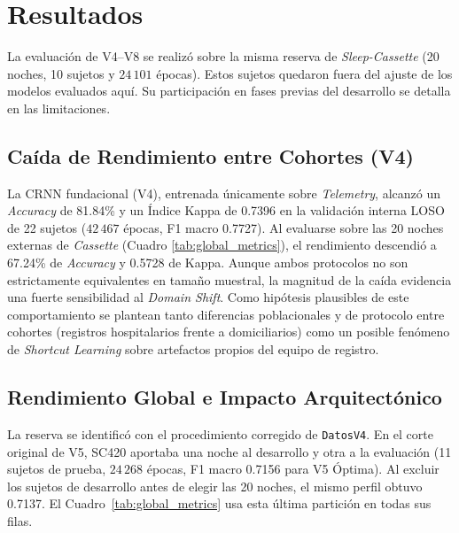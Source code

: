 \documentclass[conference]{IEEEtran}
\begin{document}
\section{Resultados}

La evaluación de V4--V8 se realizó sobre la misma reserva de \textit{Sleep-Cassette} (20 noches, 10 sujetos y $24\,101$ épocas). Estos sujetos quedaron fuera del ajuste de los modelos evaluados aquí. Su participación en fases previas del desarrollo se detalla en las limitaciones.

\subsection{Caída de Rendimiento entre Cohortes (V4)}
La CRNN fundacional (V4), entrenada únicamente sobre \textit{Telemetry}, alcanzó un \textit{Accuracy} de 81.84\% y un Índice Kappa de 0.7396 en la validación interna LOSO de 22 sujetos ($42\,467$ épocas, F1 macro 0.7727). Al evaluarse sobre las 20 noches externas de \textit{Cassette} (Cuadro \ref{tab:global_metrics}), el rendimiento descendió a 67.24\% de \textit{Accuracy} y 0.5728 de Kappa. Aunque ambos protocolos no son estrictamente equivalentes en tamaño muestral, la magnitud de la caída evidencia una fuerte sensibilidad al \textit{Domain Shift}. Como hipótesis plausibles de este comportamiento se plantean tanto diferencias poblacionales y de protocolo entre cohortes (registros hospitalarios frente a domiciliarios) como un posible fenómeno de \textit{Shortcut Learning} \cite{geirhos2020shortcut} sobre artefactos propios del equipo de registro.

\subsection{Rendimiento Global e Impacto Arquitectónico}
La reserva se identificó con el procedimiento corregido de \texttt{DatosV4}. En el corte original de V5, SC420 aportaba una noche al desarrollo y otra a la evaluación (11 sujetos de prueba, $24\,268$ épocas, F1 macro 0.7156 para V5 Óptima). Al excluir los sujetos de desarrollo antes de elegir las 20 noches, el mismo perfil obtuvo 0.7137. El Cuadro~\ref{tab:global_metrics} usa esta última partición en todas sus filas.
\end{document}
